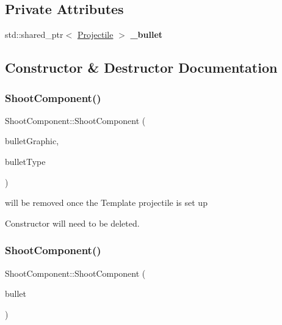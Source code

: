 \subsection*{Private Attributes}
\begin{DoxyCompactItemize}
\item 
\mbox{\label{class_shoot_component_a1f7cba7f1948db5f6150d96163c64f52}} 
std\+::shared\+\_\+ptr$<$ \hyperlink{class_projectile}{Projectile} $>$ {\bfseries \+\_\+bullet}
\end{DoxyCompactItemize}


\subsection{Constructor \& Destructor Documentation}
\mbox{\label{class_shoot_component_a3c0334d147d54522d58a379d6e473006}} 
\subsubsection{\texorpdfstring{Shoot\+Component()}{ShootComponent()}\hspace{0.1cm}{\footnotesize\ttfamily [1/2]}}
{\footnotesize\ttfamily Shoot\+Component\+::\+Shoot\+Component (\begin{DoxyParamCaption}\item[{const std\+::shared\+\_\+ptr$<$ \hyperlink{class_graphic_object}{Graphic\+Object} $>$ \&}]{bullet\+Graphic,  }\item[{Game\+Object\+Type}]{bullet\+Type }\end{DoxyParamCaption})}



will be removed once the Template projectile is set up 

Constructor will need to be deleted. \mbox{\label{class_shoot_component_a38ab688c7cf0775b4f15124a1c02bfc7}} 
\subsubsection{\texorpdfstring{Shoot\+Component()}{ShootComponent()}\hspace{0.1cm}{\footnotesize\ttfamily [2/2]}}
{\footnotesize\ttfamily Shoot\+Component\+::\+Shoot\+Component (\begin{DoxyParamCaption}\item[{std\+::shared\+\_\+ptr$<$ \hyperlink{class_projectile}{Projectile} $>$}]{bullet }\end{DoxyParamCaption})}



